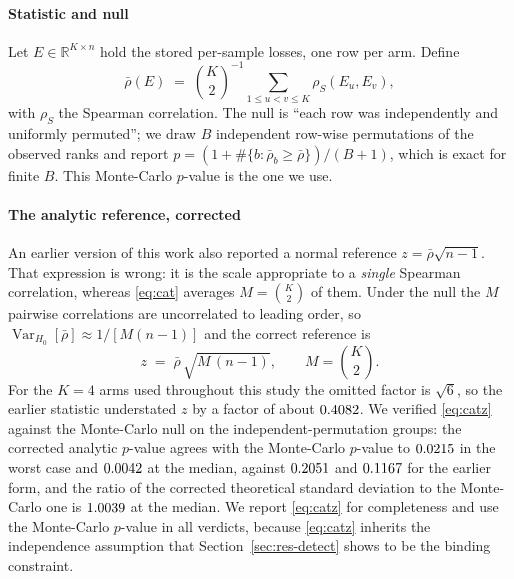 \documentclass[a4paper,fleqn]{cas-sc}
\begin{document}
\paragraph{Statistic and null}
Let $E \in \mathbb{R}^{K \times n}$ hold the stored per-sample losses, one row per
arm. Define
\begin{equation}
\bar{\rho}(E) \;=\; \binom{K}{2}^{-1} \sum_{1 \le u < v \le K}
\rho_S\!\left(E_u, E_v\right),
\label{eq:cat}
\end{equation}
with $\rho_S$ the Spearman correlation. The null is ``each row was independently
and uniformly permuted''; we draw $B$ independent row-wise permutations of the
observed ranks and report
$p = (1 + \#\{b : \bar{\rho}_b \ge \bar{\rho}\})/(B+1)$, which is exact for finite
$B$. This Monte-Carlo $p$-value is the one we use.

\paragraph{The analytic reference, corrected}
An earlier version of this work also reported a normal reference
$z = \bar{\rho}\sqrt{n-1}$. That expression is wrong: it is the scale appropriate
to a \emph{single} Spearman correlation, whereas \eqref{eq:cat} averages
$M = \binom{K}{2}$ of them. Under the null the $M$ pairwise correlations are
uncorrelated to leading order, so
$\operatorname{Var}_{H_0}[\bar{\rho}] \approx 1/[M(n-1)]$ and the correct
reference is
\begin{equation}
z \;=\; \bar{\rho}\,\sqrt{M\,(n-1)}, \qquad M = \binom{K}{2}.
\label{eq:catz}
\end{equation}
For the $K = 4$ arms used throughout this study the omitted factor is
$\sqrt{6}$, so the earlier statistic understated $z$ by a factor of about
$0.4082{}$. We verified \eqref{eq:catz} against the
Monte-Carlo null on the \NumCatAnalyticRows{} independent-permutation groups: the
corrected analytic $p$-value agrees with the Monte-Carlo $p$-value to
$0.0215{}$ in the worst case and $0.0042{}$ at
the median, against $0.2051{}$ and
$0.1167{}$ for the earlier form, and the ratio of the
corrected theoretical standard deviation to the Monte-Carlo one is
$1.0039{}$ at the median. We report
\eqref{eq:catz} for completeness and use the Monte-Carlo $p$-value in all
verdicts, because \eqref{eq:catz} inherits the independence assumption that
Section~\ref{sec:res-detect} shows to be the binding constraint.
\end{document}
